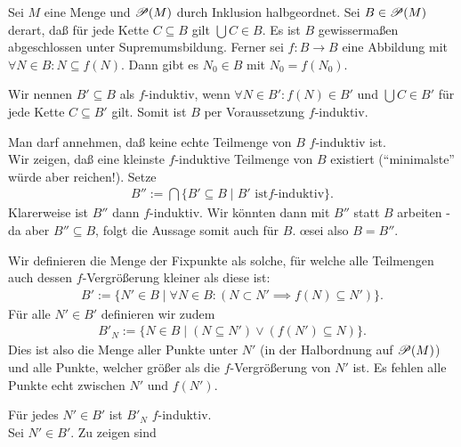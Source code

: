 \documentclass[../../main.tex]{subfiles}
\begin{document}
\begin{lem}\label{12.2.6} 
	Sei $M$ eine Menge und $\mathcal P(M)$ durch Inklusion halbgeordnet. Sei $B\in\mathcal P(M)$ derart, daß für jede Kette $C\subseteq B$ gilt $\bigcup C\in B$. Es ist $B$ gewissermaßen abgeschlossen unter Supremumsbildung. Ferner sei $f: B\rightarrow B$ eine Abbildung mit $\forall N\in B: N\subseteq f(N)$. Dann gibt es $N_0\in B$ mit $N_0=f(N_0)$.
\end{lem}
\begin{cproof}
	Wir nennen $B'\subseteq B$ als $f$-induktiv, wenn $\forall N\in B': f(N)\in B'$ und $\bigcup C\in B'$ für jede Kette $C\subseteq B'$ gilt. Somit ist $B$ per Voraussetzung $f$-induktiv.\\	
	\begin{tcolorbox}[arc=0mm, boxrule=0.2mm]
			Man darf annehmen, daß keine echte Teilmenge von $B$ $f$-induktiv ist. \\
			Wir zeigen, daß eine kleinste $f$-induktive Teilmenge von $B$ existiert (\enquote{minimalste} würde aber reichen!). Setze
			\begin{align*}
				B'':=\bigcap\{B'\subseteq B\mid B'\text{ ist}f\text{-induktiv}\}.
			\end{align*}
			Klarerweise ist $B''$ dann $f$-induktiv. Wir könnten dann mit $B''$ statt $B$ arbeiten - da aber $B''\subseteq B$, folgt die Aussage somit auch für $B$. \oe sei also $B=B''$.
	\end{tcolorbox}
	\noindent Wir definieren die Menge der Fixpunkte als  solche, für welche alle Teilmengen auch dessen $f$-Vergrößerung kleiner als diese ist:
	\begin{align*}
		B':=\{N'\in B\mid \forall N\in B: (N\subset N'\implies f(N)\subseteq N')\}.
	\end{align*}
	Für alle $N'\in B'$ definieren wir zudem
	\begin{align*}
		B'_N:=\{N\in B\mid(N\subseteq N')\lor(f(N')\subseteq N)\}.
	\end{align*}
	Dies ist also die Menge aller Punkte unter $N'$ (in der Halbordnung auf $\mathcal P(M)$) und alle Punkte, welcher größer als die $f$-Vergrößerung von $N'$ ist. Es fehlen alle Punkte echt zwischen $N'$ und $f(N')$.
	\begin{tcolorbox}[arc=0mm, boxrule=0.2mm]
			Für jedes $N'\in B'$ ist $B'_N$ $f$-induktiv. \\
			Sei $N'\in B'$. Zu zeigen sind
			\begin{enumerate}[\normalfont(b)]

\end{enumerate}
\end{tcolorbox}
\end{cproof}
\end{document}
